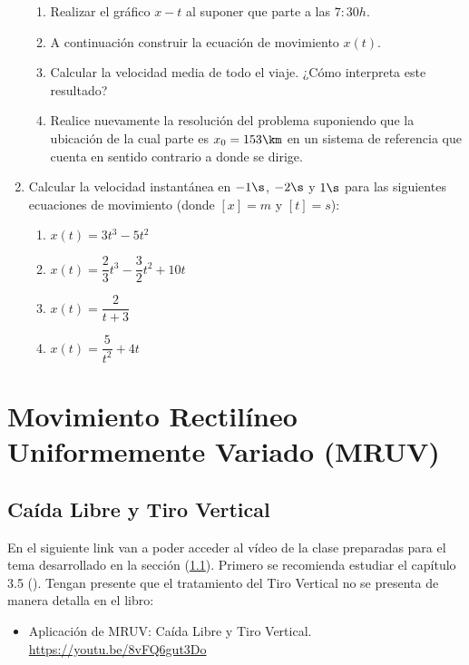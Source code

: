 \begin{enumerate}
\begin{enumerate}
    \item Realizar el gráfico $x-t$ al suponer que parte a las $7:30h$.
    \item A continuación construir la ecuación de movimiento $x(t)$. 
    \item Calcular la velocidad media de todo el viaje. ¿Cómo interpreta este
    resultado?
    \item Realice nuevamente la resolución del problema suponiendo que la
    ubicación de la cual parte es $x_0=153\km$ en un sistema de referencia que
    cuenta en sentido contrario a donde se dirige.
    \end{enumerate}
  \item Calcular la velocidad instantánea en $-1\s$, $-2\s$ y $1\s$ para las
  siguientes ecuaciones de movimiento (donde $[x]=m$ y $[t]=s$):
    \begin{enumerate}
      \item $x(t)=3t^3-5t^2$
      \item $x(t)=\dfrac{2}{3}t^3 -\dfrac{3}{2}t^2 +10t$
      \item $x(t)=\dfrac{2}{t+3}$
      \item $x(t)=\dfrac{5}{t^2} + 4t$
    \end{enumerate}
\end{enumerate}
\normalsize



\section{Movimiento Rectilíneo Uniformemente Variado (MRUV)}


\subsection{Caída Libre y Tiro Vertical}
\label{c.cltv}

En el siguiente link van a poder acceder al vídeo de la clase
preparadas para el tema desarrollado en la sección (\ref{c.cltv}). Primero se
recomienda estudiar el capítulo 3.5 (\citeauthor{alvarenga}). Tengan presente
que el tratamiento del Tiro Vertical no se presenta de manera detalla en el
libro:

\begin{itemize}
  \item Aplicación de MRUV: Caída Libre y Tiro Vertical. \\
    \href{https://youtu.be/8vFQ6gut3Do}{https://youtu.be/8vFQ6gut3Do}
\end{itemize}


